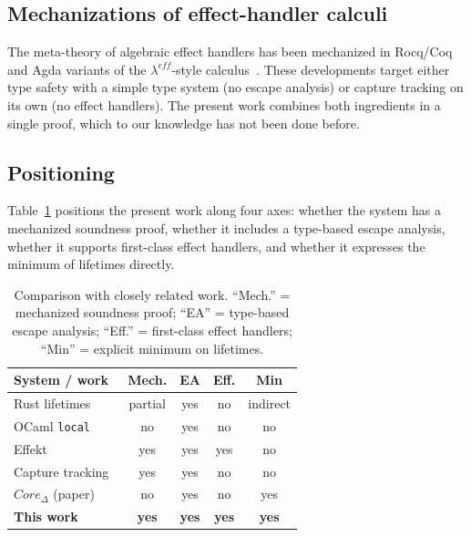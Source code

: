 \documentclass[12pt,a4paper]{article}
\begin{document}
    \subsection{Mechanizations of effect-handler calculi}

    The meta-theory of algebraic effect handlers has been mechanized in Rocq/Coq
    and Agda variants of the $\lambda^{eff}$-style
    calculus~\cite{brachthauser2020effects, brachthauser2022effects}.
    These developments target either type safety with a simple type system (no
    escape analysis) or capture tracking on its own (no effect handlers).
    The present work combines both ingredients in a single proof, which to our
    knowledge has not been done before.

    \subsection{Positioning}

    Table~\ref{tab:comparison} positions the present work along four axes:
    whether the system has a mechanized soundness proof, whether it includes a
    type-based escape analysis, whether it supports first-class effect handlers,
    and whether it expresses the minimum of lifetimes directly.

    \begin{table}[h]
        \centering
        \small
        \caption{Comparison with closely related work.
            ``Mech.'' = mechanized soundness proof;
            ``EA'' = type-based escape analysis;
            ``Eff.'' = first-class effect handlers;
            ``Min'' = explicit minimum on lifetimes.}
        \label{tab:comparison}
        \begin{tabular}{@{}lcccc@{}}
            \toprule
            \textbf{System / work} & \textbf{Mech.} & \textbf{EA} & \textbf{Eff.} & \textbf{Min} \\
            \midrule
            Rust lifetimes~\cite{matsakis2014rust}             & partial & yes & no  & indirect \\
            OCaml \texttt{local}~\cite{lorenzen2024oxidizing}  & no      & yes & no  & no       \\
            Effekt~\cite{brachthauser2020effects}              & yes     & yes & yes & no       \\
            Capture tracking~\cite{boruch2023capturing}        & yes     & yes & no  & no       \\
            $Core_\Delta$ (paper)~\cite{stoyan2025existential} & no      & yes & no  & yes      \\
            \textbf{This work}                                 & \textbf{yes} & \textbf{yes} & \textbf{yes} & \textbf{yes} \\
            \bottomrule
        \end{tabular}
    \end{table}
\end{document}
